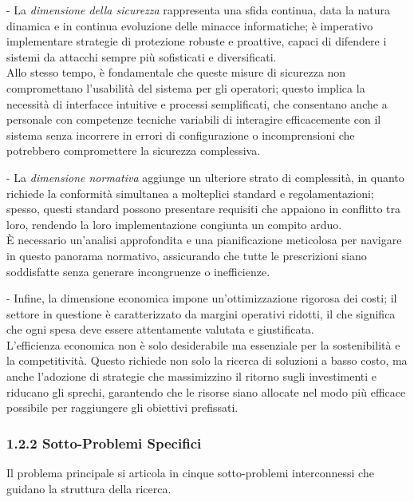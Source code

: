 \documentclass{report}
\begin{document}
- La \emph{dimensione della sicurezza} rappresenta una sfida continua,
data la natura dinamica e in continua evoluzione delle minacce
informatiche; è imperativo implementare strategie di protezione robuste
e proattive, capaci di difendere i sistemi da attacchi sempre più
sofisticati e diversificati.\\
Allo stesso tempo, è fondamentale che queste misure di sicurezza non
compromettano l'usabilità del sistema per gli operatori; questo implica
la necessità di interfacce intuitive e processi semplificati, che
consentano anche a personale con competenze tecniche variabili di
interagire efficacemente con il sistema senza incorrere in errori di
configurazione o incomprensioni che potrebbero compromettere la
sicurezza complessiva.

- La \emph{dimensione normativa} aggiunge un ulteriore strato di
complessità, in quanto richiede la conformità simultanea a molteplici
standard e regolamentazioni; spesso, questi standard possono presentare
requisiti che appaiono in conflitto tra loro, rendendo la loro
implementazione congiunta un compito arduo.\\
È necessario un'analisi approfondita e una pianificazione meticolosa per
navigare in questo panorama normativo, assicurando che tutte le
prescrizioni siano soddisfatte senza generare incongruenze o
inefficienze.

- Infine, la dimensione economica impone un'ottimizzazione rigorosa dei
costi; il settore in questione è caratterizzato da margini operativi
ridotti, il che significa che ogni spesa deve essere attentamente
valutata e giustificata.\\
L'efficienza economica non è solo desiderabile ma essenziale per la
sostenibilità e la competitività. Questo richiede non solo la ricerca di
soluzioni a basso costo, ma anche l'adozione di strategie che
massimizzino il ritorno sugli investimenti e riducano gli sprechi,
garantendo che le risorse siano allocate nel modo più efficace possibile
per raggiungere gli obiettivi prefissati.

\subsubsection{\texorpdfstring{\textbf{1.2.2 Sotto-Problemi
Specifici}}{1.2.2 Sotto-Problemi Specifici}}\label{sotto-problemi-specifici}

Il problema principale si articola in cinque sotto-problemi
interconnessi che guidano la struttura della ricerca.
\end{document}

